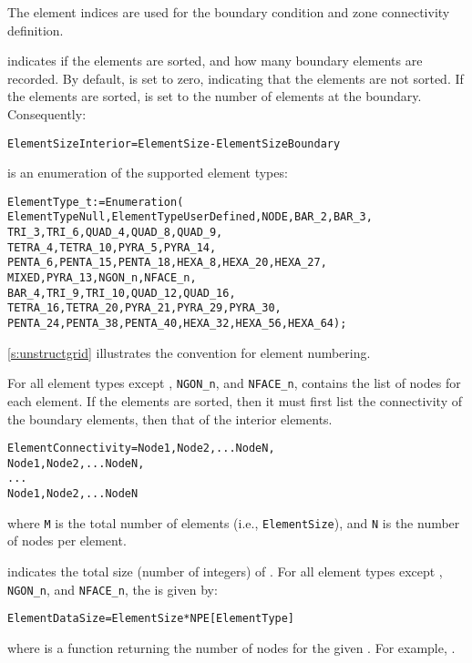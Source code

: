 The element indices are used for the boundary condition and zone
connectivity definition.

 indicates if the elements are sorted, and
how many boundary elements are recorded.
By default,  is set to zero, indicating that
the elements are not sorted.
If the elements are sorted,  is set to the
number of elements at the boundary.
Consequently:
\begin{alltt}
  ElementSizeInterior = ElementSize - ElementSizeBoundary
\end{alltt}

 is an enumeration of the supported element types:
\begin{alltt}
  ElementType\_t := Enumeration(
     ElementTypeNull, ElementTypeUserDefined, NODE, BAR\_2, BAR\_3,
     TRI\_3, TRI\_6, QUAD\_4, QUAD\_8, QUAD\_9,
     TETRA\_4, TETRA\_10, PYRA\_5, PYRA\_14,
     PENTA\_6, PENTA\_15, PENTA\_18, HEXA\_8, HEXA\_20, HEXA\_27,
     MIXED, PYRA\_13, NGON\_n, NFACE\_n,
     BAR\_4, TRI\_9, TRI\_10, QUAD\_12, QUAD\_16,
     TETRA\_16, TETRA\_20, PYRA\_21, PYRA\_29, PYRA\_30,
     PENTA\_24, PENTA\_38, PENTA\_40, HEXA\_32, HEXA\_56, HEXA\_64 );
\end{alltt}
\autoref{s:unstructgrid} illustrates the convention for element numbering.

For all element types except , \texttt{NGON\_n},
and \texttt{NFACE\_n}, 
contains the list of nodes for each element.
If the elements are sorted, then it must first list the connectivity of
the boundary elements, then that of the interior elements.
\begin{alltt}
  ElementConnectivity = Node1, Node2, ... NodeN,
                        Node1, Node2, ... NodeN,
                        ...
                        Node1, Node2, ... NodeN
\end{alltt}
where \texttt{M} is the total number of elements (i.e.,
\texttt{ElementSize}), and \texttt{N} is the number of nodes per
element.

 indicates the total size (number of integers) of
.
For all element types except , \texttt{NGON\_n},
and \texttt{NFACE\_n}, the 
is given by:
\begin{alltt}
  ElementDataSize = ElementSize * NPE[ElementType]
\end{alltt}
where  is a function returning the number of
nodes for the given .
For example, .

